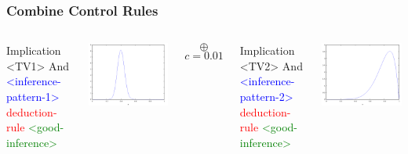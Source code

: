 \documentclass{beamer}
\begin{document}
\begin{frame}[fragile]
  \frametitle{Combine Control Rules}

\begin{columns}

\column{1.1in}

{\tiny
\begin{semiverbatim}
Implication <TV1>
  And
    \textcolor{blue}{<inference-pattern-1>}
    \textcolor{red}{deduction-rule}
  \textcolor{green}{<good-inference>}
\end{semiverbatim}
}

\includegraphics[scale=0.2]{images/Beta_40_60.png}

\column{0.4in}
\begin{center}
  $$\oplus$$
  {\tiny $$c=0.01$$}
\end{center}

\column{1.3in}

{\tiny
\begin{semiverbatim}
Implication <TV2>
  And
    \textcolor{blue}{<inference-pattern-2>}
    \textcolor{red}{deduction-rule}
  \textcolor{green}{<good-inference>}
\end{semiverbatim}
}

\includegraphics[scale=0.2]{images/Beta_8_2.png}


\end{columns}
\end{frame}
\end{document}

